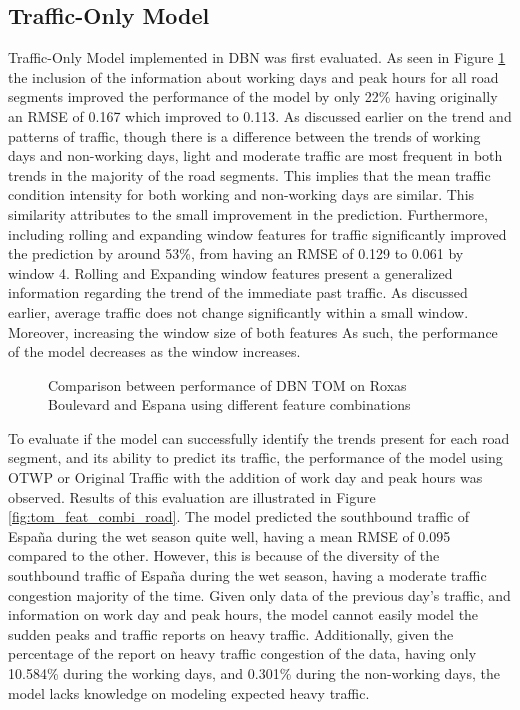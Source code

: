 \subsection{Traffic-Only Model}
Traffic-Only Model implemented in DBN was first evaluated. 
As seen in Figure \ref{fig:tom_diff_feat_combi} the inclusion of the information about working days and peak hours for all road segments improved the performance of the model by only 22\% having originally an RMSE of 0.167 which improved to 0.113. As discussed earlier on the trend and patterns of traffic, though there is a difference between the trends of working days and non-working days, light and moderate traffic are most frequent in both trends in the majority of the road segments. This implies that the mean traffic condition intensity for both working and non-working days are similar. This similarity attributes to the small improvement in the prediction. Furthermore, including rolling and expanding window features for traffic significantly improved the prediction by around 53\%, from having an RMSE of 0.129 to 0.061 by window 4. Rolling and Expanding window features present a generalized information regarding the trend of the immediate past traffic. As discussed earlier, average traffic does not change significantly within a small window. Moreover, increasing the window size of both features As such, the performance of the model decreases as the window increases. 

\begin{figure}[h]
  \centering
  \captionsetup{justification=centering}
  \caption{Comparison between performance of DBN TOM on Roxas Boulevard and Espana using different feature combinations}
  \label{fig:tom_diff_feat_combi}
\end{figure}

To evaluate if the model can successfully identify the trends present for each road segment, and its ability to predict its traffic, the performance of the model using OTWP or Original Traffic with the addition of work day and peak hours was observed. Results of this evaluation are illustrated in Figure \ref{fig:tom_feat_combi_road}. The model predicted the southbound traffic of España during the wet season quite well, having a mean RMSE of 0.095 compared to the other. However, this is because of the diversity of the southbound traffic of España during the wet season, having a moderate traffic congestion majority of the time. Given only data of the previous day’s traffic, and information on work day and peak hours, the model cannot easily model the sudden peaks and traffic reports on heavy traffic. Additionally, given the percentage of the report on heavy traffic congestion of the data, having only 10.584\% during the working days, and 0.301\% during the non-working days, the model lacks knowledge on modeling expected heavy traffic. 

